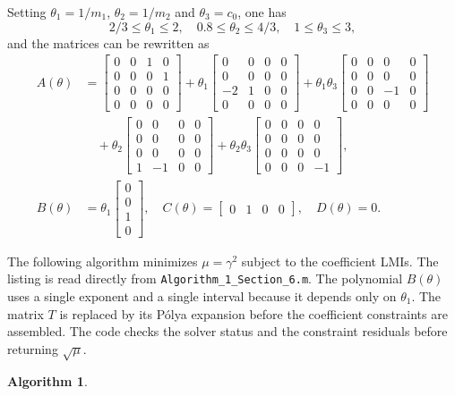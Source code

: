 \documentclass[english,11pt]{article}
\theoremstyle{break} \theorembodyfont{\small\rm}
\newtheorem{algorithm}{\bf Algorithm}
\begin{document}
Setting $\theta_1 = 1/m_1$, $\theta_2 = 1/m_2$ and $\theta_3 = c_0$, one has
\[
 2/3 \leq \theta_1 \leq 2, \quad 0.8 \leq \theta_2 \leq 4/3, \quad 1 \leq \theta_3 \leq 3,
\]
and the matrices can be rewritten as
\begin{align*}
 A(\theta) &=
 \begin{bmatrix} 0 & 0 & 1 & 0 \\ 0 & 0 & 0 & 1 \\ 0 & 0 & 0 & 0 \\ 0 & 0 & 0 & 0 \end{bmatrix}
 + \theta_1 \begin{bmatrix} 0 & 0 & 0 & 0 \\ 0 & 0 & 0 & 0 \\ -2 & 1 & 0 & 0 \\ 0 & 0 & 0 & 0 \end{bmatrix}
 + \theta_1\theta_3 \begin{bmatrix} 0 & 0 & 0 & 0 \\ 0 & 0 & 0 & 0 \\ 0 & 0 & -1 & 0 \\ 0 & 0 & 0 & 0 \end{bmatrix}\\
 &\quad + \theta_2 \begin{bmatrix} 0 & 0 & 0 & 0 \\ 0 & 0 & 0 & 0 \\ 0 & 0 & 0 & 0 \\ 1 & -1 & 0 & 0 \end{bmatrix}
 + \theta_2\theta_3 \begin{bmatrix} 0 & 0 & 0 & 0 \\ 0 & 0 & 0 & 0 \\ 0 & 0 & 0 & 0 \\ 0 & 0 & 0 & -1 \end{bmatrix},\\
 B(\theta) &= \theta_1 \begin{bmatrix} 0 \\ 0 \\ 1 \\ 0 \end{bmatrix}, \quad
 C(\theta) = \begin{bmatrix} 0 & 1 & 0 & 0 \end{bmatrix}, \quad D(\theta) = 0.
\end{align*}

The following algorithm minimizes $\mu=\gamma^2$ subject to the
coefficient LMIs. The listing is read directly from
\texttt{Algorithm\_1\_Section\_6.m}.
The polynomial $B(\theta)$ uses a single exponent and a single interval
because it depends only on $\theta_1$. The matrix $T$ is replaced by
its P\'{o}lya expansion before the coefficient constraints are assembled.
The code checks the solver status and the constraint residuals before
returning $\sqrt{\mu}$.
\noindent\begin{minipage}{\linewidth}
\begin{algorithm}\label{algo_hinf}

\end{algorithm}
\end{minipage}
\end{document}
